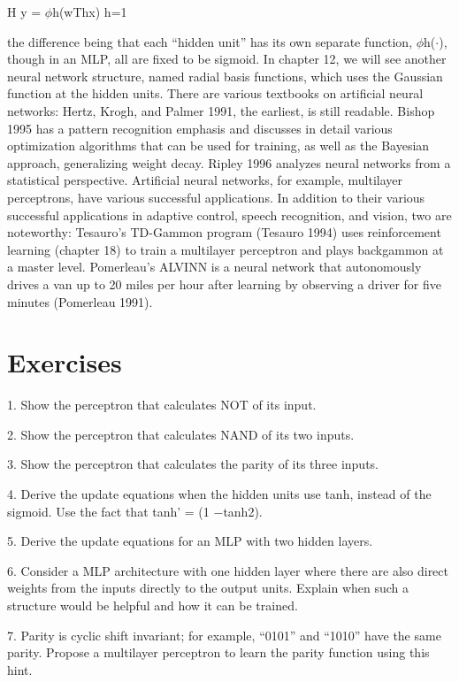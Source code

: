 H y = $\phi$h(wThx) h=1

the difference being that each “hidden unit” has its own separate function, $\phi$h($\cdot$), though in an MLP, all are fixed to be sigmoid. In chapter 12, we will see another neural network structure, named radial basis functions, which uses the Gaussian function at the hidden units. There are various textbooks on artificial neural networks: Hertz, Krogh, and Palmer 1991, the earliest, is still readable. Bishop 1995 has a pattern recognition emphasis and discusses in detail various optimization algorithms that can be used for training, as well as the Bayesian approach, generalizing weight decay. Ripley 1996 analyzes neural networks from a statistical perspective. Artificial neural networks, for example, multilayer perceptrons, have various successful applications. In addition to their various successful applications in adaptive control, speech recognition, and vision, two are noteworthy: Tesauro’s TD-Gammon program (Tesauro 1994) uses reinforcement learning (chapter 18) to train a multilayer perceptron and plays backgammon at a master level. Pomerleau’s ALVINN is a neural network that autonomously drives a van up to 20 miles per hour after learning by observing a driver for five minutes (Pomerleau 1991).

\section{Exercises}

1. Show the perceptron that calculates NOT of its input.

2. Show the perceptron that calculates NAND of its two inputs.

3. Show the perceptron that calculates the parity of its three inputs.

4. Derive the update equations when the hidden units use tanh, instead of the sigmoid. Use the fact that tanh' = (1 $-$tanh2).

5. Derive the update equations for an MLP with two hidden layers.

6. Consider a MLP architecture with one hidden layer where there are also direct weights from the inputs directly to the output units. Explain when such a structure would be helpful and how it can be trained.

7. Parity is cyclic shift invariant; for example, “0101” and “1010” have the same parity. Propose a multilayer perceptron to learn the parity function using this hint.

